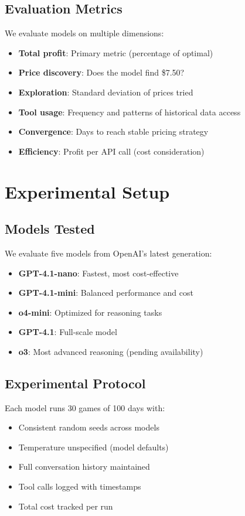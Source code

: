 \documentclass[11pt]{article}
\begin{document}
\subsection{Evaluation Metrics}

We evaluate models on multiple dimensions:

\begin{itemize}
    \item \textbf{Total profit}: Primary metric (percentage of optimal)
    \item \textbf{Price discovery}: Does the model find \$7.50?
    \item \textbf{Exploration}: Standard deviation of prices tried
    \item \textbf{Tool usage}: Frequency and patterns of historical data access
    \item \textbf{Convergence}: Days to reach stable pricing strategy
    \item \textbf{Efficiency}: Profit per API call (cost consideration)
\end{itemize}

\section{Experimental Setup}

\subsection{Models Tested}

We evaluate five models from OpenAI's latest generation:
\begin{itemize}
    \item \textbf{GPT-4.1-nano}: Fastest, most cost-effective
    \item \textbf{GPT-4.1-mini}: Balanced performance and cost
    \item \textbf{o4-mini}: Optimized for reasoning tasks
    \item \textbf{GPT-4.1}: Full-scale model
    \item \textbf{o3}: Most advanced reasoning (pending availability)
\end{itemize}

\subsection{Experimental Protocol}

Each model runs 30 games of 100 days with:
\begin{itemize}
    \item Consistent random seeds across models
    \item Temperature unspecified (model defaults)
    \item Full conversation history maintained
    \item Tool calls logged with timestamps
    \item Total cost tracked per run
\end{itemize}
\end{document}
